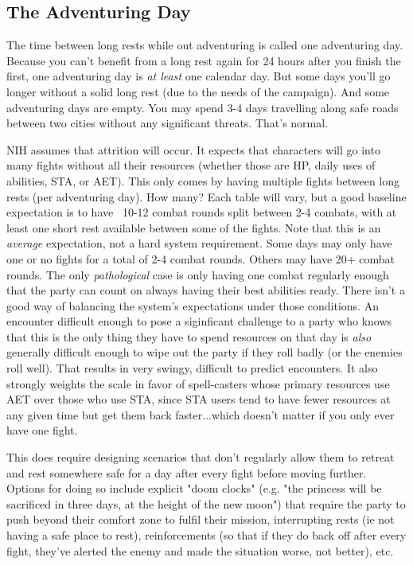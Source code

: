 \documentclass[10pt,twoside,openany,bg=none]{dndbook}
\begin{document}
\subsection{The Adventuring Day}
The time between long rests while out adventuring is called one adventuring day. Because you can't benefit from a long rest again for 24 hours after you finish the first, one adventuring day is \textit{at least} one calendar day. But some days you'll go longer without a solid long rest (due to the needs of the campaign). And some adventuring days are empty. You may spend 3-4 days travelling along safe roads between two cities without any significant threats. That's normal.

NIH assumes that attrition will occur. It expects that characters will go into many fights without all their resources (whether those are HP, daily uses of abilities, STA, or AET). This only comes by having multiple fights between long rests (per adventuring day). How many? Each table will vary, but a good baseline expectation is to have ~10-12 combat rounds split between 2-4 combats, with at least one short rest available between some of the fights. Note that this is an \textit{average} expectation, not a hard system requirement. Some days may only have one or no fights for a total of 2-4 combat rounds. Others may have 20+ combat rounds. The only \textit{pathological} case is only having one combat regularly enough that the party can count on always having their best abilities ready. There isn't a good way of balancing the system's expectations under those conditions. An encounter difficult enough to pose a siginficant challenge to a party who knows that this is the only thing they have to spend resources on that day is \textit{also} generally difficult enough to wipe out the party if they roll badly (or the enemies roll well). That results in very swingy, difficult to predict encounters. It also strongly weights the scale in favor of spell-casters whose primary resources use AET over those who use STA, since STA users tend to have fewer resources at any given time but get them back faster...which doesn't matter if you only ever have one fight.

This does require designing scenarios that don't regularly allow them to retreat and rest somewhere safe for a day after every fight before moving further. Options for doing so include explicit "doom clocks" (e.g. "the princess will be sacrificed in three days, at the height of the new moon") that require the party to push beyond their comfort zone to fulfil their mission, interrupting rests (ie not having a safe place to rest), reinforcements (so that if they do back off after every fight, they've alerted the enemy and made the situation worse, not better), etc. 
\end{document}
